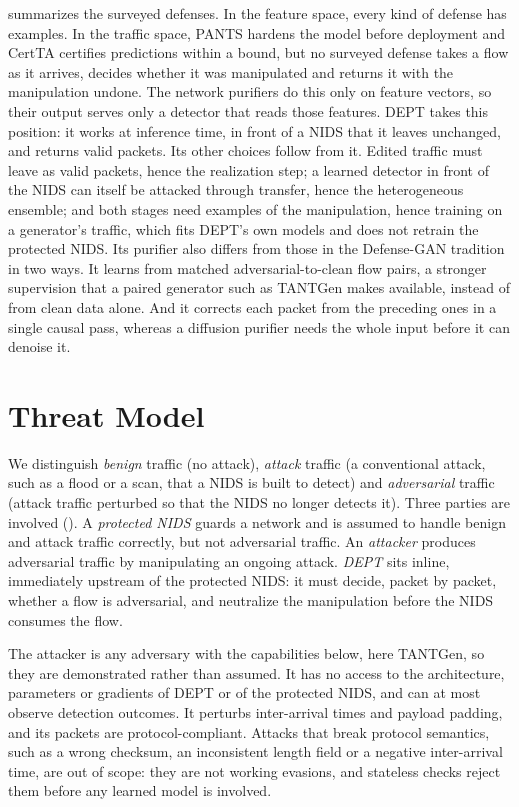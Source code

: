 \documentclass[acmtog,nonacm,pbalance]{acmart}
\begin{document}
 summarizes the surveyed defenses. In the feature space,
every kind of defense has examples. In the traffic space, PANTS hardens the
model before deployment and CertTA certifies predictions within a bound, but no
surveyed defense takes a flow as it arrives, decides whether it was manipulated
and returns it with the manipulation undone. The network purifiers do this
only on feature vectors, so their output serves only a detector that reads
those features. DEPT takes this position: it works at inference time, in front
of a NIDS that it leaves unchanged, and returns valid packets. Its other
choices follow from it. Edited traffic must leave as valid packets, hence the
realization step; a learned detector in front of the NIDS can itself be
attacked through transfer, hence the heterogeneous ensemble; and both stages
need examples of the manipulation, hence training on a generator's traffic, which
fits DEPT's own models and does not retrain the protected NIDS. Its purifier
also differs from those in the Defense-GAN tradition in two ways. It learns
from matched adversarial-to-clean flow pairs, a stronger supervision that a
paired generator such as TANTGen makes available, instead of from clean data
alone. And it corrects each packet from the preceding ones in a single causal
pass, whereas a diffusion purifier needs the whole input before it can denoise
it.

\section{Threat Model}\label{sec:threat}

We distinguish \emph{benign} traffic (no attack), \emph{attack} traffic (a
conventional attack, such as a flood or a scan, that a NIDS is built to detect)
and \emph{adversarial} traffic (attack traffic perturbed so that the NIDS no
longer detects it). Three parties are involved (). A
\emph{protected NIDS} guards a network and is assumed to handle benign and
attack traffic correctly, but not adversarial traffic. An \emph{attacker}
produces adversarial traffic by manipulating an ongoing attack. \emph{DEPT} sits
inline, immediately upstream of the protected NIDS: it must decide, packet by
packet, whether a flow is adversarial, and neutralize the manipulation before
the NIDS consumes the flow.

The attacker is any adversary with the capabilities below, here TANTGen, so they
are demonstrated rather than assumed. It has no access to the architecture,
parameters or gradients of DEPT or of the protected NIDS, and can at most
observe detection outcomes. It perturbs inter-arrival times and payload
padding, and its packets are protocol-compliant. Attacks that break protocol
semantics, such as a wrong checksum, an inconsistent length field or a negative
inter-arrival time, are out of scope: they are not working evasions, and
stateless checks reject them before any learned model is involved.
\end{document}
